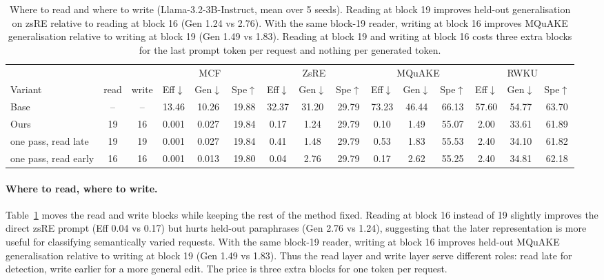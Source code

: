 \documentclass{article}
\theoremstyle{remark}
\theoremstyle{definition}
\begin{document}
\begin{table}[t]
\centering
\small
\setlength{\tabcolsep}{3.4pt}
\begin{tabular}{l c c ccc ccc ccc ccc}
\toprule
& & & \multicolumn{3}{c}{MCF} & \multicolumn{3}{c}{ZsRE} & \multicolumn{3}{c}{MQuAKE} & \multicolumn{3}{c}{RWKU} \\
\cmidrule(lr){4-6}\cmidrule(lr){7-9}\cmidrule(lr){10-12}\cmidrule(lr){13-15}
Variant & read & write & Eff$\downarrow$ & Gen$\downarrow$ & Spe$\uparrow$ & Eff$\downarrow$ & Gen$\downarrow$ & Spe$\uparrow$ & Eff$\downarrow$ & Gen$\downarrow$ & Spe$\uparrow$ & Eff$\downarrow$ & Gen$\downarrow$ & Spe$\uparrow$ \\
\midrule
Base & -- & -- & 13.46 & 10.26 & 19.88 & 32.37 & 31.20 & 29.79 & 73.23 & 46.44 & 66.13 & 57.60 & 54.77 & 63.70 \\
Ours & 19 & 16 & 0.001 & 0.027 & 19.84 & 0.17 & 1.24 & 29.79 & 0.10 & 1.49 & 55.07 & 2.00 & 33.61 & 61.89 \\
one pass, read late & 19 & 19 & 0.001 & 0.027 & 19.84 & 0.41 & 1.48 & 29.79 & 0.53 & 1.83 & 55.53 & 2.40 & 34.10 & 61.82 \\
one pass, read early & 16 & 16 & 0.001 & 0.013 & 19.80 & 0.04 & 2.76 & 29.79 & 0.17 & 2.62 & 55.25 & 2.40 & 34.81 & 62.18 \\
\bottomrule
\end{tabular}
\caption{Where to read and where to write (Llama-3.2-3B-Instruct, mean over 5 seeds). Reading at block 19 improves held-out generalisation on zsRE relative to reading at block 16 (Gen 1.24 vs 2.76). With the same block-19 reader, writing at block 16 improves MQuAKE generalisation relative to writing at block 19 (Gen 1.49 vs 1.83). Reading at block 19 and writing at block 16 costs three extra blocks for the last prompt token per request and nothing per generated token.}
\label{tab:ablation_layers}
\end{table}

\paragraph{Where to read, where to write.}
Table~\ref{tab:ablation_layers} moves the read and write blocks while keeping the rest of the method fixed. Reading at block 16 instead of 19 slightly improves the direct zsRE prompt (Eff 0.04 vs 0.17) but hurts held-out paraphrases (Gen 2.76 vs 1.24), suggesting that the later representation is more useful for classifying semantically varied requests. With the same block-19 reader, writing at block 16 improves held-out MQuAKE generalisation relative to writing at block 19 (Gen 1.49 vs 1.83). Thus the read layer and write layer serve different roles: read late for detection, write earlier for a more general edit. The price is three extra blocks for one token per request.
\end{document}
